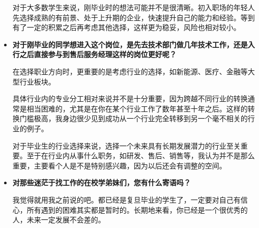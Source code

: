 \begin{itemize}
对于大多数学生来说，刚毕业时的想法可能并不是很清晰。初入职场的年轻人先选择成熟的有前景、处于上升期的企业，快速提升自己的能力和经验。等到有了一定的积累之后再考虑其他选择，这样更为稳妥，风险也相对较小。

    \item \textbf{对于刚毕业的同学想进入这个岗位，是先去技术部门做几年技术工作，还是入行之后直接参与到售后服务经理这样的岗位更好呢？}

    在选择职业方向时，更重要的是考虑行业的选择，如新能源、医疗、金融等大型行业板块。

具体行业内的专业分工相对来说并不是十分重要，因为跨越不同行业的转换通常是相当困难的，尤其是在你在某个行业工作了数年甚至十年之后。这样的转换门槛极高，我身边很少见到成功从一个行业完全转移到另一个毫不相关的行业的例子。

对于毕业生的行业选择来说，选择一个未来具有长期发展潜力的行业至关重要。至于在行业内从事什么职务，如研发、售后、销售等，我认为并不是那么重要，主要看个人是不是特别感兴趣，因为以后还会有调整的空间。

    \item \textbf{对那些迷茫于找工作的在校学弟妹们，您有什么寄语吗？}

    我觉得就用我之前说的吧。都已经是复旦毕业的学生了，一定要对自己有信心，所有遇到的困难其实都是暂时的。长期地来看，你已经是一个很优秀的人，未来一定发展不会差的。
    
\end{itemize}

